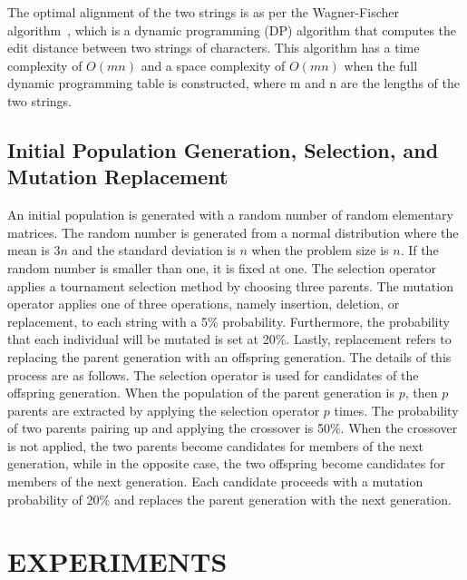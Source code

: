 The optimal alignment of the two strings is as per the Wagner-Fischer algorithm~\cite{wagner1974string}, which is a dynamic programming (DP) algorithm that computes the edit distance between two strings of characters. This algorithm has a time complexity of $ O\left(mn\right) $ and a space complexity of $ O\left(mn\right) $ when the full dynamic programming table is constructed, where m and n are the lengths of the two strings.

\subsection{Initial Population Generation, Selection, and Mutation Replacement}
An initial population is generated with a random number of random elementary matrices. The random number is generated from a normal distribution where the mean is $ 3n $ and the standard deviation is $ n $ when the problem size is $ n $. If the random number is smaller than one, it is fixed at one. The selection operator applies a tournament selection method by choosing three parents. The mutation operator applies one of three operations, namely insertion, deletion, or replacement, to each string with a 5\% probability. Furthermore, the probability that each individual will be mutated is set at 20\%. Lastly, replacement refers to replacing the parent generation with an offspring generation. The details of this process are as follows. The selection operator is used for candidates of the offspring generation. When the population of the parent generation is $ p $, then $ p $ parents are extracted by applying the selection operator $ p $ times. The probability of two parents pairing up and applying the crossover is 50\%. When the crossover is not applied, the two parents become candidates for members of the next generation, while in the opposite case, the two offspring become candidates for members of the next generation. Each candidate proceeds with a mutation probability of 20\% and replaces the parent generation with the next generation.


\section{EXPERIMENTS} \label{sec6:experiments}
